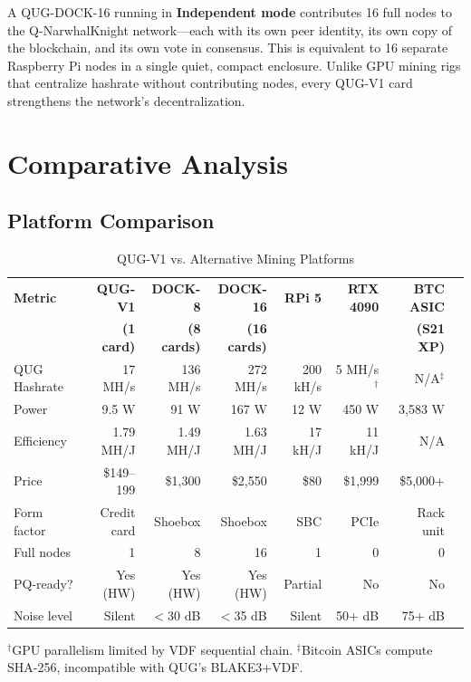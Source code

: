 \documentclass[11pt,a4paper]{article}
\begin{document}
\begin{tcolorbox}[colback=green!5,colframe=quggreen,title=\textbf{Decentralization Benefit}]
A QUG-DOCK-16 running in \textbf{Independent mode} contributes 16 full nodes to the Q-NarwhalKnight network---each with its own peer identity, its own copy of the blockchain, and its own vote in consensus. This is equivalent to 16 separate Raspberry Pi nodes in a single quiet, compact enclosure. Unlike GPU mining rigs that centralize hashrate without contributing nodes, every QUG-V1 card strengthens the network's decentralization.
\end{tcolorbox}

\section{Comparative Analysis}
\label{sec:comparison}

\subsection{Platform Comparison}

\begin{table}[H]
\centering
\caption{QUG-V1 vs. Alternative Mining Platforms}
\label{tab:comparison}
\begin{tabular}{@{}lrrrrrrr@{}}
\toprule
\textbf{Metric} & \textbf{QUG-V1} & \textbf{DOCK-8} & \textbf{DOCK-16} & \textbf{RPi 5} & \textbf{RTX 4090} & \textbf{BTC ASIC} \\
 & \textbf{(1 card)} & \textbf{(8 cards)} & \textbf{(16 cards)} & & & \textbf{(S21 XP)} \\
\midrule
QUG Hashrate & 17 MH/s & 136 MH/s & 272 MH/s & 200 kH/s & 5 MH/s$^\dagger$ & N/A$^\ddagger$ \\
Power & 9.5 W & 91 W & 167 W & 12 W & 450 W & 3,583 W \\
Efficiency & 1.79 MH/J & 1.49 MH/J & 1.63 MH/J & 17 kH/J & 11 kH/J & N/A \\
Price & \$149--199 & \$1,300 & \$2,550 & \$80 & \$1,999 & \$5,000+ \\
Form factor & Credit card & Shoebox & Shoebox & SBC & PCIe & Rack unit \\
Full nodes & 1 & 8 & 16 & 1 & 0 & 0 \\
PQ-ready? & Yes (HW) & Yes (HW) & Yes (HW) & Partial & No & No \\
Noise level & Silent & $<$30 dB & $<$35 dB & Silent & 50+ dB & 75+ dB \\
\bottomrule
\end{tabular}

\vspace{0.3cm}
{\footnotesize $^\dagger$GPU parallelism limited by VDF sequential chain. $^\ddagger$Bitcoin ASICs compute SHA-256, incompatible with QUG's BLAKE3+VDF.}
\end{table}
\end{document}
